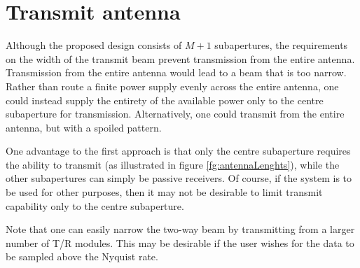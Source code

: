 \section{Transmit antenna}
Although the proposed design consists of $M+1$ subapertures, the requirements on the width of the transmit beam prevent transmission from the entire antenna. Transmission from the entire antenna would lead to a beam that is too narrow. Rather than route a finite power supply evenly across the entire antenna, one could instead supply the entirety of the available power only to the centre subaperture for transmission. Alternatively, one could transmit from the entire antenna, but with a spoiled pattern.
\par
One advantage to the first approach is that only the centre subaperture requires the ability to transmit (as illustrated in figure \ref{fg:antennaLenghts}), while the other subapertures can simply be passive receivers. Of course, if the system is to be used for other purposes, then it may not be desirable to limit transmit capability only to the centre subaperture.
\par
Note that one can easily narrow the two-way beam by transmitting from a larger number of T/R modules. This may be desirable if the user wishes for the data to be sampled above the Nyquist rate.
